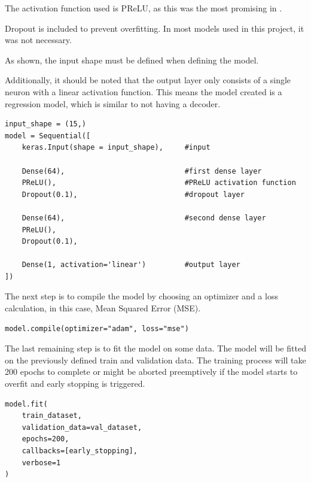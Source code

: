 \documentclass{article}
\begin{document}
The activation function used is PReLU, as this was the most promising in \cite{trask2018neuralarithmeticlogicunits}.

Dropout is included to prevent overfitting. In most models used in this project, it was not necessary.

As shown, the input shape must be defined when defining the model.

Additionally, it should be noted that the output layer only consists of a single neuron with a linear activation function. This means the model created is a regression model, which is similar to not having a decoder.

\newpage
\begin{Verbatim}
input_shape = (15,)
model = Sequential([
    keras.Input(shape = input_shape),     #input

    Dense(64),                            #first dense layer
    PReLU(),                              #PReLU activation function
    Dropout(0.1),                         #dropout layer

    Dense(64),                            #second dense layer
    PReLU(),                                
    Dropout(0.1),                           

    Dense(1, activation='linear')         #output layer
])
\end{Verbatim}

The next step is to compile the model by choosing an optimizer and a loss calculation, in this case, Mean Squared Error (MSE).
\begin{Verbatim}
model.compile(optimizer="adam", loss="mse")
\end{Verbatim}

The last remaining step is to fit the model on some data. The model will be fitted on the previously defined train and validation data. The training process will take 200 epochs to complete or might be aborted preemptively if the model starts to overfit and early stopping is triggered.

\begin{Verbatim}
model.fit(
    train_dataset,
    validation_data=val_dataset,
    epochs=200,
    callbacks=[early_stopping],
    verbose=1
)
\end{Verbatim}
\end{document}
